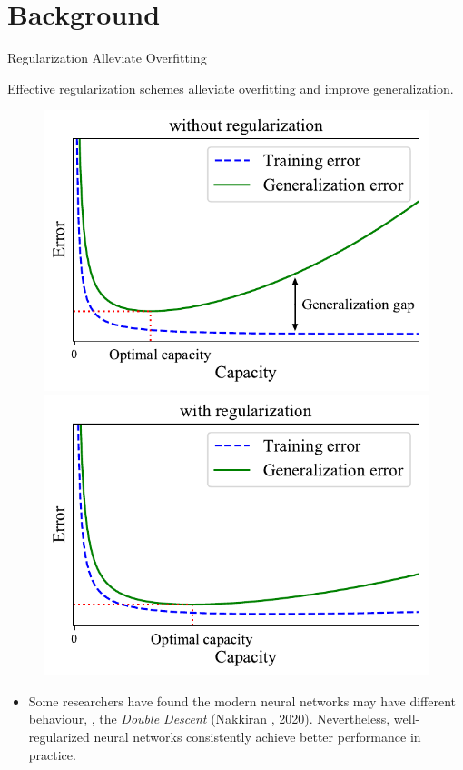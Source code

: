 \section{Background}


\begin{frame}{Regularization Alleviate Overfitting}




Effective regularization schemes alleviate overfitting and improve generalization.

\begin{figure}
\includegraphics[width=.45\textwidth]{figs/gap1.pdf}
\includegraphics[width=.45\textwidth]{figs/gap2.pdf}
\end{figure}
\vspace{-1em}
{\small
\begin{itemize}
    \item Some researchers have found the modern neural networks may have different behaviour, \ie, the {\em Double Descent} (Nakkiran \etal, 2020). Nevertheless, well-regularized neural networks consistently achieve better performance in practice.
\end{itemize}
}

\end{frame}

